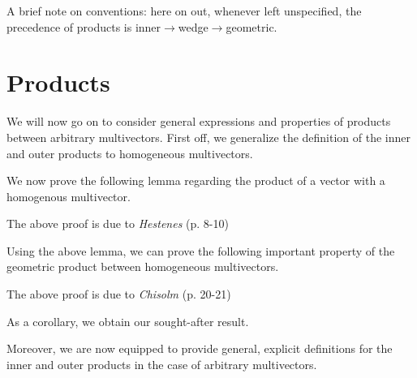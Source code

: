 % 
% 

A brief note on conventions: here on out, whenever left unspecified, the precedence of products is inner$\to$wedge$\to$geometric.

%
%



\section{Products}\label{s:products}
We will now go on to consider general expressions and properties of products between arbitrary multivectors.
First off, we generalize the definition of the inner and outer products to homogeneous multivectors.



We now prove the following lemma regarding the product of a vector with a homogenous multivector.



The above proof is due to \textit{Hestenes} (p. 8-10)\cite{ga-origin}

Using the above lemma, we can prove the following important property of the geometric product between homogeneous multivectors.



The above proof is due to \textit{Chisolm} (p. 20-21)\cite{ga-chisolm}

As a corollary, we obtain our sought-after result.



Moreover, we are now equipped to provide general, explicit definitions for the inner and outer products in the case of arbitrary multivectors.




